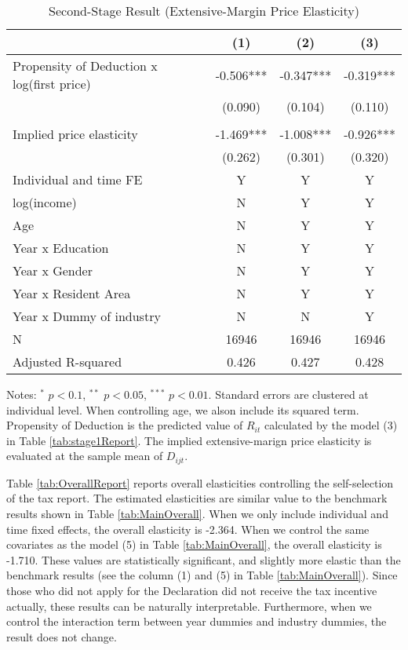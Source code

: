\documentclass[
  11pt,
  a4paper,
]{article}
\begin{document}
\begin{table}

\caption{\label{tab:ExtensiveReport}Second-Stage Result (Extensive-Margin Price Elasticity)}
\centering
\fontsize{7}{9}\selectfont
\begin{threeparttable}
\begin{tabular}[t]{lccc}
\toprule
 & (1) & (2) & (3)\\
\midrule
Propensity of Deduction x log(first price) & -0.506*** & -0.347*** & -0.319***\\
 & (0.090) & (0.104) & (0.110)\\
 &  &  & \\
Implied price elasticity & -1.469*** & -1.008*** & -0.926***\\
 & (0.262) & (0.301) & (0.320)\\
Individual and time FE & Y & Y & Y\\
log(income) & N & Y & Y\\
Age & N & Y & Y\\
Year x Education & N & Y & Y\\
Year x Gender & N & Y & Y\\
Year x Resident Area & N & Y & Y\\
Year x Dummy of industry & N & N & Y\\
N & 16946 & 16946 & 16946\\
Adjusted R-squared & 0.426 & 0.427 & 0.428\\
\bottomrule
\end{tabular}
\begin{tablenotes}
\item Notes: $^{*}$ $p < 0.1$, $^{**}$ $p < 0.05$, $^{***}$ $p < 0.01$. Standard errors are clustered at individual level. When controlling age, we alson include its squared term. Propensity of Deduction is the predicted value of $R_{it}$ calculated by the model (3) in Table \ref{tab:stage1Report}. The implied extensive-marign price elasticity is evaluated at the sample mean of $D_{ijt}$.
\end{tablenotes}
\end{threeparttable}
\end{table}

Table \ref{tab:OverallReport} reports overall elasticities controlling the self-selection of the tax report.
The estimated elasticities are similar value to the benchmark results shown in Table \ref{tab:MainOverall}.
When we only include individual and time fixed effects, the overall elasticity is -2.364.
When we control the same covariates as the model (5) in Table \ref{tab:MainOverall},
the overall elasticity is -1.710.
These values are statistically significant,
and slightly more elastic than the benchmark results
(see the column (1) and (5) in Table \ref{tab:MainOverall}).
Since those who did not apply for the Declaration did not receive the tax incentive actually,
these results can be naturally interpretable.
Furthermore, when we control the interaction term between year dummies and industry dummies,
the result does not change.
\end{document}
